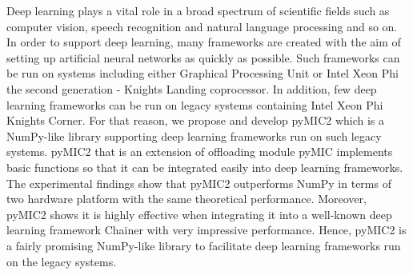 Deep learning plays a vital role in a broad spectrum of scientific fields such as computer vision, speech recognition and natural language processing and so on. In order to support deep learning, many frameworks are created with the aim of setting up artificial neural networks as quickly as possible. Such frameworks can be run on systems including either Graphical Processing Unit or Intel Xeon Phi the second generation - Knights Landing coprocessor. In addition, few deep learning frameworks can be run on legacy systems containing Intel Xeon Phi Knights Corner. For that reason, we propose and develop pyMIC2 which is a NumPy-like library supporting deep learning frameworks run on such legacy systems. pyMIC2 that is an extension of offloading module pyMIC implements basic functions so that it can be integrated easily into deep learning frameworks. The experimental findings show that pyMIC2 outperforms NumPy in terms of two hardware platform with the same theoretical performance. Moreover, pyMIC2 shows it is highly effective when integrating it into a well-known deep learning framework Chainer with very impressive performance. Hence, pyMIC2 is a fairly promising NumPy-like library to facilitate deep learning frameworks run on the legacy systems.